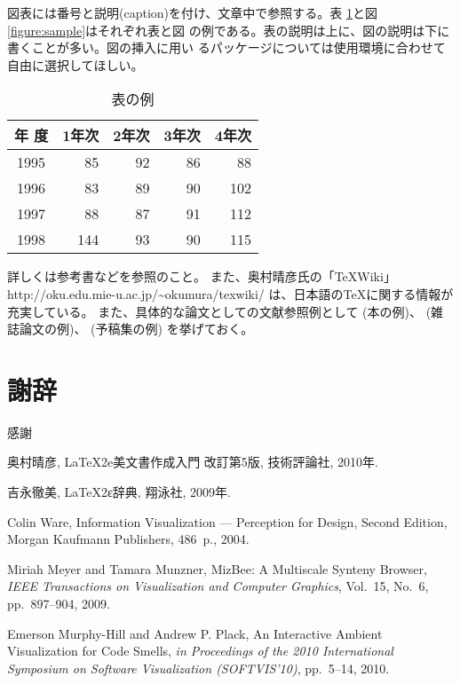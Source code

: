 \documentclass[a4paper,11pt]{jreport}
\begin{document}
図表には番号と説明(caption)を付け、文章中で参照する。表
\ref{table:fundamental_data_type}と図\ref{figure:sample}はそれぞれ表と図
の例である。表の説明は上に、図の説明は下に書くことが多い。図の挿入に用い
るパッケージについては使用環境に合わせて自由に選択してほしい。

\begin{table}[hbt]
\caption{表の例}
\label{table:fundamental_data_type}
\begin{center}
\begin{tabular}{| c | r | r | r | r |}
\hline
年 度 & 1年次 & 2年次 & 3年次 & 4年次 \\
\hline
1995 & 85 & 92 & 86 & 88 \\
1996 & 83 & 89 & 90 & 102 \\
1997 & 88 & 87 & 91 & 112 \\
1998 & 144 & 93 & 90 & 115 \\
\hline 
\end{tabular}
\end{center}
\end{table}
\medskip


詳しくは参考書\cite{okumura2010,yoshinaga2009}などを参照のこと。
また、奥村晴彦氏の「\TeX Wiki」
http://oku.edu.mie-u.ac.jp/\textasciitilde{}okumura/texwiki/
は、日本語の\TeX に関する情報が充実している。
また、具体的な論文としての文献参照例として
(本の例)\cite{ware2004}、
(雑誌論文の例)\cite{meyer2009}、
(予稿集の例)\cite{hill2010}
を挙げておく。

\chapter*{謝辞}

感謝

\newpage


\renewcommand{\bibname}{参考文献}

%
%

\begin{thebibliography}{1}
奥村晴彦, LaTeX2e美文書作成入門 改訂第5版, 技術評論社, 2010年.

吉永徹美, LaTeX2ε辞典, 翔泳社, 2009年.

Colin Ware, Information Visualization --- Perception for Design, Second Edition, Morgan Kaufmann Publishers, 486~p., 2004.

Miriah Meyer and Tamara Munzner, MizBee: A Multiscale Synteny Browser, {\em IEEE Transactions on Visualization and Computer Graphics}, Vol.~15, No.~6, pp.~897--904, 2009.

Emerson Murphy-Hill and Andrew P. Plack, An Interactive Ambient Visualization for Code Smells, {\em in Proceedings of the 2010 International Symposium on Software Visualization (SOFTVIS’10)}, pp.~5--14, 2010.

\end{thebibliography}
\end{document}
